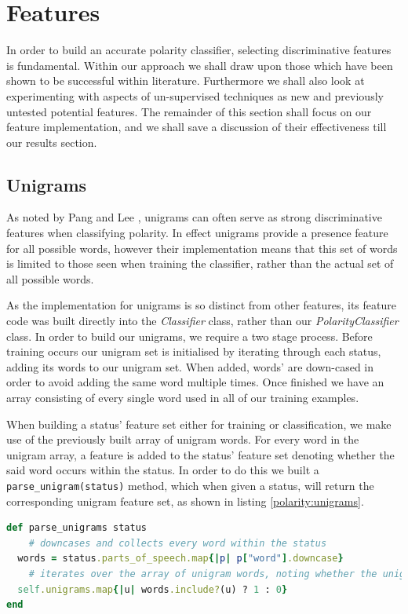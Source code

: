 \section{Features}

In order to build an accurate polarity classifier, selecting discriminative features is fundamental. Within our approach we shall draw upon those which have been shown to be successful within literature. Furthermore we shall also look at experimenting with aspects of un-supervised techniques as new and previously untested potential features. The remainder of this section shall focus on our feature implementation, and we shall save a discussion of their effectiveness till our results section.

\subsection{Unigrams}

As noted by Pang and Lee \cite{Pang:2002tu}, unigrams can often serve as strong discriminative features when classifying polarity. In effect unigrams provide a presence feature for all possible words, however their implementation means that this set of words is limited to those seen when training the classifier, rather than the actual set of all possible words.

As the implementation for unigrams is so distinct from other features, its feature code was built directly into the \emph{Classifier} class, rather than our \emph{PolarityClassifier} class. In order to build our unigrams, we require a two stage process. Before training occurs our unigram set is initialised by iterating through each status, adding its words to our unigram set.  When added, words' are down-cased in order to avoid adding the same word multiple times. Once finished we have an array consisting of every single word used in all of our training examples.

When building a status' feature set either for training or classification, we make use of the previously built array of unigram words. For every word in the unigram array, a feature is added to the status' feature set denoting whether the said word occurs within the status. In order to do this we built a \texttt{parse\_unigram(status)} method, which when given a status, will return the corresponding unigram feature set, as shown in listing \ref{polarity:unigrams}.

\begin{lstlisting}[language=Ruby, caption={\emph{Classifier} class' \texttt{parse\_unigram} method.}, label=polarity:unigrams]
def parse_unigrams status
	# downcases and collects every word within the status
  words = status.parts_of_speech.map{|p| p["word"].downcase}
	# iterates over the array of unigram words, noting whether the unigram exists within our status' set of words 
  self.unigrams.map{|u| words.include?(u) ? 1 : 0}
end
\end{lstlisting}

